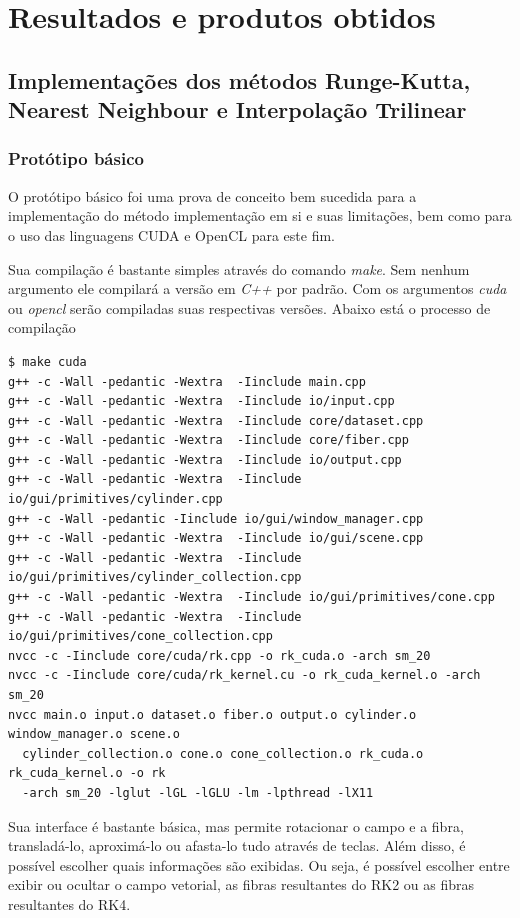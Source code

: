 \chapter{Resultados e produtos obtidos}

\section{Implementações dos métodos Runge-Kutta, Nearest Neighbour e Interpolação Trilinear}
  \subsection{Protótipo básico}
  O protótipo básico foi uma prova de conceito bem sucedida para a implementação do método implementação em si e suas limitações, bem como para o uso das linguagens CUDA e OpenCL para este fim.
  
  Sua compilação é bastante simples através do comando \textit{make}. Sem nenhum argumento ele compilará a versão em \textit{C++} por padrão. Com os argumentos \textit{cuda} ou \textit{opencl} serão compiladas suas respectivas versões. Abaixo está o processo de compilação
  
  {\scriptsize
  \begin{verbatim}
$ make cuda
g++ -c -Wall -pedantic -Wextra  -Iinclude main.cpp
g++ -c -Wall -pedantic -Wextra  -Iinclude io/input.cpp
g++ -c -Wall -pedantic -Wextra  -Iinclude core/dataset.cpp
g++ -c -Wall -pedantic -Wextra  -Iinclude core/fiber.cpp
g++ -c -Wall -pedantic -Wextra  -Iinclude io/output.cpp
g++ -c -Wall -pedantic -Wextra  -Iinclude io/gui/primitives/cylinder.cpp
g++ -c -Wall -pedantic -Iinclude io/gui/window_manager.cpp
g++ -c -Wall -pedantic -Wextra  -Iinclude io/gui/scene.cpp
g++ -c -Wall -pedantic -Wextra  -Iinclude io/gui/primitives/cylinder_collection.cpp
g++ -c -Wall -pedantic -Wextra  -Iinclude io/gui/primitives/cone.cpp
g++ -c -Wall -pedantic -Wextra  -Iinclude io/gui/primitives/cone_collection.cpp
nvcc -c -Iinclude core/cuda/rk.cpp -o rk_cuda.o -arch sm_20
nvcc -c -Iinclude core/cuda/rk_kernel.cu -o rk_cuda_kernel.o -arch sm_20
nvcc main.o input.o dataset.o fiber.o output.o cylinder.o window_manager.o scene.o
  cylinder_collection.o cone.o cone_collection.o rk_cuda.o rk_cuda_kernel.o -o rk
  -arch sm_20 -lglut -lGL -lGLU -lm -lpthread -lX11
  \end{verbatim}
  }
  
  \newpage
  Sua interface é bastante básica, mas permite rotacionar o campo e a fibra, transladá-lo, aproximá-lo ou afasta-lo tudo através de teclas. Além disso, é possível escolher quais informações são exibidas. Ou seja, é possível escolher entre exibir ou ocultar o campo vetorial, as fibras resultantes do RK2 ou as fibras resultantes do RK4.
  
